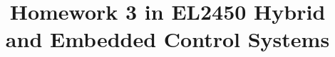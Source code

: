 \documentclass[a4paper,12pt,oneside,onecolumn]{article} %
\begin{document}

\title{Homework 3 in EL2450 Hybrid and Embedded Control Systems}


\maketitle                     %





%
%
%
%
\end{document}
